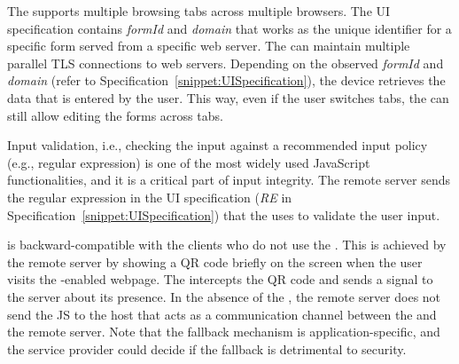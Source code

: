 The \device supports multiple browsing tabs across multiple browsers. The UI specification contains \emph{formId} and \emph{domain} that works as the unique identifier for a specific form served from a specific web server. The \device can maintain multiple parallel TLS connections to web servers. Depending on the observed \emph{formId} and \emph{domain} (refer to Specification~\ref{snippet:UISpecification}), the device retrieves the data that is entered by the user. This way, even if the user switches tabs, the \device can still allow editing the forms across tabs.


 Input validation, i.e., checking the input against a recommended input policy (e.g., regular expression) is one of the most widely used JavaScript functionalities, and it is a critical part of input integrity. The remote server sends the regular expression in the UI specification (\emph{RE} in Specification~\ref{snippet:UISpecification}) that the \device uses to validate the user input.



 \name is backward-compatible with the clients who do not use the \device. This is achieved by the remote server by showing a QR code briefly on the screen when the user visits the \name-enabled webpage. The \device intercepts the QR code and sends a signal to the server about its presence. In the absence of the \device, the remote server does not send the \name JS to the host that acts as a communication channel between the \device and the remote server. Note that the fallback mechanism is application-specific, and the service provider could decide if the fallback is detrimental to security.

